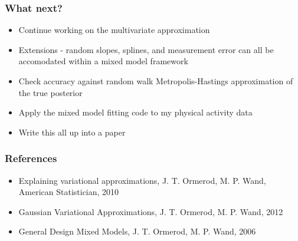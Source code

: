 \documentclass{beamer}
\begin{document}
\begin{frame}
\frametitle{What next?}
\begin{itemize}
\item Continue working on the multivariate approximation
\item Extensions - random slopes, splines, and measurement error can all be accomodated within a mixed model
framework
\item Check accuracy against random walk Metropolis-Hastings approximation of the true posterior
\item Apply the mixed model fitting code to my physical activity data
\item Write this all up into a paper
\end{itemize}
\end{frame}

\begin{frame}
\frametitle{References}
\begin{itemize}
\item Explaining variational approximations, J. T. Ormerod, M. P. Wand, American Statistician, 2010
\item Gaussian Variational Approximations, J. T. Ormerod, M. P. Wand, 2012
\item General Design Mixed Models, J. T. Ormerod, M. P. Wand, 2006
\end{itemize}
\end{frame}
\end{document}
